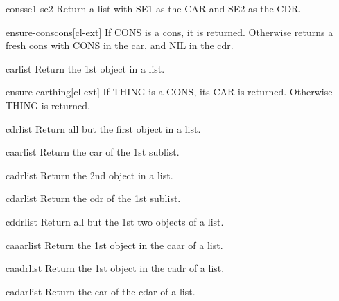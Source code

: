 \documentclass[10pt,english]{book}
\begin{document}
\begin{function}{cons}{se1 se2}
  Return a list with SE1 as the CAR and SE2 as the CDR.
\end{function}

\begin{function}{ensure-cons}{cons}[cl-ext]
  If CONS is a cons, it is returned. Otherwise returns a fresh cons with CONS
  in the car, and NIL in the cdr.
\end{function}

\begin{accessor}{car}{list}
  Return the 1st object in a list.
\end{accessor}

\begin{function}{ensure-car}{thing}[cl-ext]
  If THING is a CONS, its CAR is returned. Otherwise THING is returned.
\end{function}

\begin{accessor}{cdr}{list}
  Return all but the first object in a list.
\end{accessor}

\begin{accessor}{caar}{list}
  Return the car of the 1st sublist.
\end{accessor}

\begin{accessor}{cadr}{list}
  Return the 2nd object in a list.
\end{accessor}

\begin{accessor}{cdar}{list}
  Return the cdr of the 1st sublist.
\end{accessor}

\begin{accessor}{cddr}{list}
  Return all but the 1st two objects of a list.
\end{accessor}

\begin{accessor}{caaar}{list}
  Return the 1st object in the caar of a list.
\end{accessor}

\begin{accessor}{caadr}{list}
  Return the 1st object in the cadr of a list.
\end{accessor}

\begin{accessor}{cadar}{list}
  Return the car of the cdar of a list.
\end{accessor}
\end{document}
